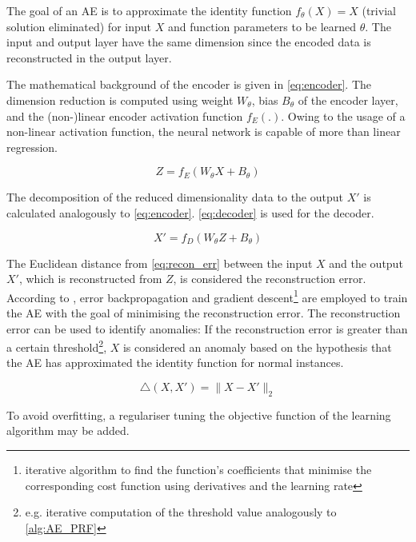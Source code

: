 The goal of an \ac{AE} is to approximate the identity function $f_\theta(X) = X$ (trivial solution eliminated) for input $X$ and function parameters to be learned $\theta$.
The input and output layer have the same dimension since the encoded data is reconstructed in the output layer. 

The mathematical background of the encoder is given in \eqref{eq:encoder}. The dimension reduction is computed using weight $W_\theta$, bias $B_\theta$ of the encoder layer, and the (non-)linear encoder activation function $f_E(.)$. Owing to the usage of a non-linear activation function, the neural network is capable of more than linear regression.
%
\begin{ceqn}
    \begin{equation}
    \label{eq:encoder}
        Z = f_E(W_\theta X + B_\theta)
    \end{equation}
\end{ceqn}
%
The decomposition of the reduced dimensionality data to the output $X'$ is calculated analogously to \eqref{eq:encoder}. \eqref{eq:decoder} is used for the decoder.
%
\begin{ceqn}
    \begin{equation}
    \label{eq:decoder}
        X' = f_D(W_\theta Z + B_\theta)
    \end{equation}
\end{ceqn}
%
The Euclidean distance from \eqref{eq:recon_err} between the input $X$ and the output $X'$, which is reconstructed from $Z$, is considered the reconstruction error. According to \cite{AE_RF}, error backpropagation and gradient descent\footnote{iterative algorithm to find the function’s coefficients that minimise the corresponding cost function using derivatives and the learning rate} are employed to train the \ac{AE} with the goal of minimising the reconstruction error. The reconstruction error can be used to identify anomalies: If the reconstruction error is greater than a certain threshold\footnote{e.g. iterative computation of the threshold value analogously to \autoref{alg:AE_PRF}}, $X$ is considered an anomaly based on the hypothesis that the \ac{AE} has approximated the identity function for normal instances.
%
\begin{ceqn}
    \begin{equation}
    \label{eq:recon_err}
       \triangle (X, X') = \parallel X - X' \parallel_2
    \end{equation}
\end{ceqn}
%
To avoid overfitting, a regulariser tuning the objective function of the learning algorithm may be added.

